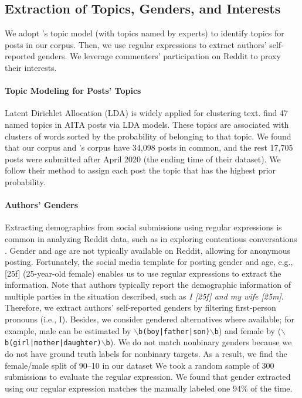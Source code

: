 \documentclass[letterpaper]{article} %
\newcommand{\citepos}[1]{\citeauthor{#1}'s \citeyearpar{#1}}
\begin{document}
\subsection{Extraction of Topics, Genders, and Interests}

We adopt \citepos{nguyen-2022-mapping} topic model (with topics named by experts) to identify topics for posts in our corpus.
Then, we use regular expressions to extract authors' self-reported genders.
We leverage commenters' participation on Reddit to proxy their interests.

\paragraph{Topic Modeling for Posts' Topics}

Latent Dirichlet Allocation (LDA) \cite{blei-2003-lda} is widely applied for clustering text.
\citet{nguyen-2022-mapping} find 47 named topics in AITA posts via LDA models.
These topics are associated with clusters of words sorted by the probability of belonging to that topic.
We found that our corpus and \citepos{nguyen-2022-mapping} corpus have 34,098 posts in common, and the rest 17,705 posts were submitted after April 2020 (the ending time of their dataset).
We follow their method to assign each post the topic that has the highest prior probability.

\paragraph{Authors' Genders}

Extracting demographics from social submissions using regular expressions is common in analyzing Reddit data, such as in exploring contentious conversations \cite{beel-2022-linguistic}.
Gender and age are not typically available on Reddit, allowing for anonymous posting.
Fortunately, the social media template for posting gender and age, e.g., [25f] (25-year-old female) enables us to use regular expressions to extract the information. 
Note that authors typically report the demographic information of multiple parties in the situation described, such as \textsl{I [25f] and my wife [25m]}.
Therefore, we extract authors' self-reported genders by filtering first-person pronouns (i.e., I).
Besides, we consider gendered alternatives where available; for example, male can be estimated by \texttt{$\backslash$b(boy|father|son)$\backslash$b}) and female by (\texttt{$\backslash$b(girl|mother|daughter)$\backslash$b}).
We do not match nonbinary genders because we do not have ground truth labels for nonbinary targets.
As a result, we find the female/male split of 90--10 in our dataset
We took a random sample of 300 submissions to evaluate the regular expression. 
We found that gender extracted using our regular expression matches the manually labeled one 94\% of the time.
\end{document}
